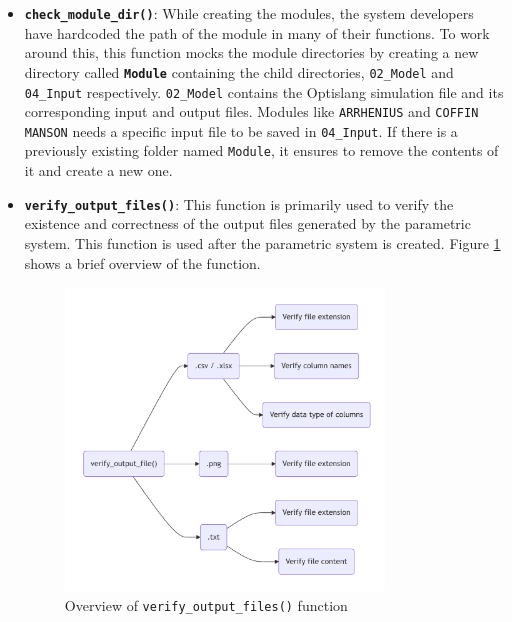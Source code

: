 \begin{itemize}
  \item \textbf{\texttt{check\_module\_dir()}}:\newline
  While creating the modules, the system developers have hardcoded the path of the module in many of their functions. To work around this, this function mocks
  the module directories by creating a new directory called \textbf{\texttt{Module}} containing the child directories, \texttt{02\_Model} and \texttt{04\_Input} 
  respectively. \texttt{02\_Model} contains the Optislang simulation file and its corresponding input and output files. Modules like \texttt{ARRHENIUS} and
  \texttt{COFFIN MANSON} needs a specific input file to be saved in \texttt{04\_Input}. If there is a previously existing folder named \texttt{Module}, it 
  ensures to remove the contents of it and create a new one. 

  \item \textbf{\texttt{verify\_output\_files()}}:\newline
  This function is primarily used to verify the existence and correctness of the output files generated by the parametric system. This function is used after
  the parametric system is created. Figure \ref{verify_output_files} shows a brief overview of the function. 
  \begin{figure}[!ht]
    \centering
    \includegraphics[width=0.8\textwidth]{Images/verify_output_file.pdf}
    \caption{Overview of \texttt{verify\_output\_files()} function}
    \label{verify_output_files}
  \end{figure}
  

\end{itemize}
